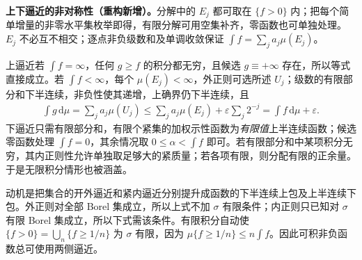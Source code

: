 \documentclass[../../main.tex]{subfiles}
\begin{document}
\begin{remark}
\textbf{上下逼近的非对称性（重构新增）。}分解中的 $E_j$ 都可取在 $\{f>0\}$ 内；把每个简单增量的非零水平集枚举即得，有限分解可用空集补齐，零函数也可单独处理。$E_j$ 不必互不相交；逐点非负级数和及单调收敛保证 $\int f=\sum_j a_j\mu(E_j)$。

上逼近若 $\int f=\infty$，任何 $g\geqslant f$ 的积分都无穷，且候选 $g\equiv+\infty$ 存在，所以等式直接成立。若 $\int f<\infty$，每个 $\mu(E_j)<\infty$，外正则可选所述 $U_j$；级数的有限部分和下半连续，非负性使其递增，上确界仍下半连续，且
\begin{align*}
\int g\,\mathrm d\mu=\sum_j a_j\mu(U_j)
\leqslant\sum_j a_j\mu(E_j)+\varepsilon\sum_j2^{-j}
=\int f\,\mathrm d\mu+\varepsilon.
\end{align*}
下逼近只需有限部分和，有限个紧集的加权示性函数为\emph{有限值}上半连续函数；候选零函数处理 $\int f=0$，其余情况取 $0\leqslant\alpha<\int f$ 即可。若有限部分和中某项积分无穷，其内正则性允许单独取足够大的紧质量；若各项有限，则分配有限的正余量。于是无限积分情形也被涵盖。

动机是把集合的开外逼近和紧内逼近分别提升成函数的下半连续上包及上半连续下包。外正则对全部 Borel 集成立，所以上式不加 $\sigma$ 有限条件；内正则只已知对 $\sigma$ 有限 Borel 集成立，所以下式需该条件。有限积分自动使 $\{f>0\}=\bigcup_n\{f\geqslant1/n\}$ 为 $\sigma$ 有限，因为 $\mu\{f\geqslant1/n\}\leqslant n\int f$。因此可积非负函数总可使用两侧逼近。
\end{remark}

\end{document}
